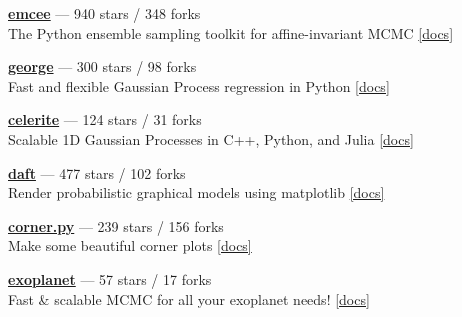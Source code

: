 \item \href{https://github.com/dfm/emcee}{{\bf emcee}} --- 940 stars / 348 forks \\
The Python ensemble sampling toolkit for affine-invariant MCMC \href{http://emcee.readthedocs.io}{[docs]}

\item \href{https://github.com/dfm/george}{{\bf george}} --- 300 stars / 98 forks \\
Fast and flexible Gaussian Process regression in Python \href{http://george.readthedocs.io}{[docs]}

\item \href{https://github.com/dfm/celerite}{{\bf celerite}} --- 124 stars / 31 forks \\
Scalable 1D Gaussian Processes in C++, Python, and Julia \href{http://celerite.rtfd.io}{[docs]}

\item \href{https://github.com/dfm/daft}{{\bf daft}} --- 477 stars / 102 forks \\
Render probabilistic graphical models using matplotlib \href{http://daft-pgm.org}{[docs]}

\item \href{https://github.com/dfm/corner.py}{{\bf corner.py}} --- 239 stars / 156 forks \\
Make some beautiful corner plots \href{http://corner.readthedocs.io}{[docs]}

\item \href{https://github.com/dfm/exoplanet}{{\bf exoplanet}} --- 57 stars / 17 forks \\
Fast {\&} scalable MCMC for all your exoplanet needs!  \href{https://exoplanet.dfm.io}{[docs]}